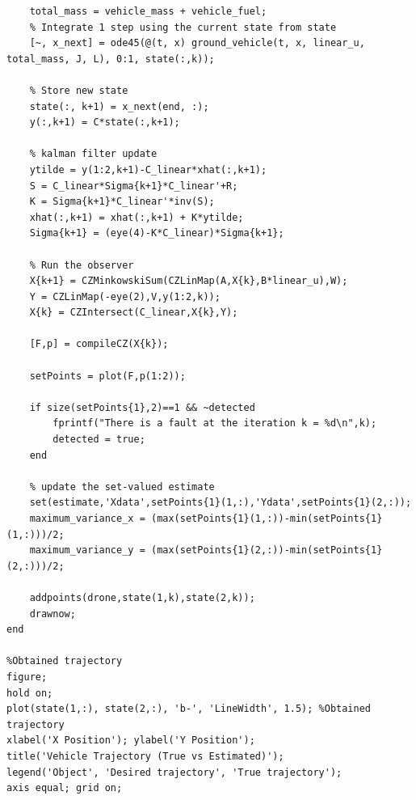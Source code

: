 \documentclass[12pt]{article}
\begin{document}
\begin{lstlisting}
    total_mass = vehicle_mass + vehicle_fuel;
    % Integrate 1 step using the current state from state
    [~, x_next] = ode45(@(t, x) ground_vehicle(t, x, linear_u, total_mass, J, L), 0:1, state(:,k));

    % Store new state   
    state(:, k+1) = x_next(end, :);
    y(:,k+1) = C*state(:,k+1);
    
    % kalman filter update 
    ytilde = y(1:2,k+1)-C_linear*xhat(:,k+1);
    S = C_linear*Sigma{k+1}*C_linear'+R;
    K = Sigma{k+1}*C_linear'*inv(S);
    xhat(:,k+1) = xhat(:,k+1) + K*ytilde;
    Sigma{k+1} = (eye(4)-K*C_linear)*Sigma{k+1};
    
    % Run the observer
    X{k+1} = CZMinkowskiSum(CZLinMap(A,X{k},B*linear_u),W);
    Y = CZLinMap(-eye(2),V,y(1:2,k));
    X{k} = CZIntersect(C_linear,X{k},Y);

    [F,p] = compileCZ(X{k});

    setPoints = plot(F,p(1:2));

    if size(setPoints{1},2)==1 && ~detected
        fprintf("There is a fault at the iteration k = %d\n",k);
        detected = true;
    end

    % update the set-valued estimate
    set(estimate,'Xdata',setPoints{1}(1,:),'Ydata',setPoints{1}(2,:));
    maximum_variance_x = (max(setPoints{1}(1,:))-min(setPoints{1}(1,:)))/2;
    maximum_variance_y = (max(setPoints{1}(2,:))-min(setPoints{1}(2,:)))/2;

    addpoints(drone,state(1,k),state(2,k));
    drawnow;
end

%Obtained trajectory
figure;
hold on;
plot(state(1,:), state(2,:), 'b-', 'LineWidth', 1.5); %Obtained trajectory
xlabel('X Position'); ylabel('Y Position');
title('Vehicle Trajectory (True vs Estimated)');
legend('Object', 'Desired trajectory', 'True trajectory');
axis equal; grid on;
\end{lstlisting}
\end{document}

